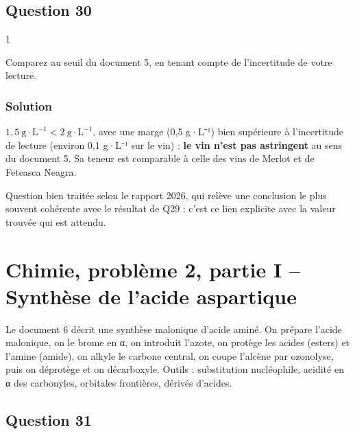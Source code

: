 \documentclass[11pt,a4paper]{article}
\begin{document}
\hypertarget{question-30}{%
\subsection{Question 30}\label{question-30}}

\begin{indication}{1}

Comparez au seuil du document 5, en tenant compte de l'incertitude de votre lecture.

\end{indication}

\hypertarget{solution-29}{%
\subsubsection{Solution}\label{solution-29}}

\(1{,}5\ \mathrm{g\cdot L^{-1}}<2\ \mathrm{g\cdot L^{-1}}\), avec une marge (0,5 g·L⁻¹) bien supérieure à l'incertitude de lecture (environ 0,1 g·L⁻¹ sur le vin) : \textbf{le vin n'est pas astringent} au sens du document 5. Sa teneur est comparable à celle des vins de Merlot et de Feteasca Neagra.

\begin{jury}

Question bien traitée selon le rapport 2026, qui relève une conclusion le plus souvent cohérente avec le résultat de Q29 : c'est ce lien explicite avec la valeur trouvée qui est attendu.

\end{jury}

\hypertarget{chimie-probluxe8me-2-partie-i-synthuxe8se-de-lacide-aspartique}{%
\section{Chimie, problème 2, partie I -- Synthèse de l'acide aspartique}\label{chimie-probluxe8me-2-partie-i-synthuxe8se-de-lacide-aspartique}}

Le document 6 décrit une synthèse malonique d'acide aminé. On prépare l'acide malonique, on le brome en α, on introduit l'azote, on protège les acides (esters) et l'amine (amide), on alkyle le carbone central, on coupe l'alcène par ozonolyse, puis on déprotège et on décarboxyle. Outils : substitution nucléophile, acidité en α des carbonyles, orbitales frontières, dérivés d'acides.

\hypertarget{question-31}{%
\subsection{Question 31}\label{question-31}}
\end{document}
